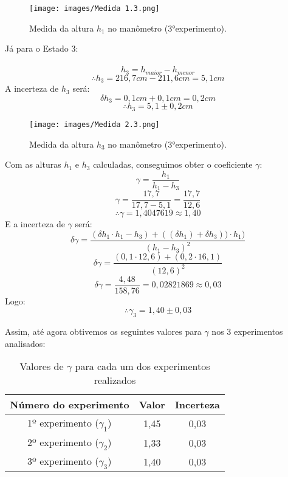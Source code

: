 \begin{figure}[H]
  \centering
  \texttt{[image: images/Medida 1.3.png]}
  \caption{Medida da altura $h_1$ no manômetro (3°experimento).}
\end{figure}

Já para o Estado 3:\\

\ \[h_3 = h_{maior} - h_{menor} \]
\[\therefore h_3 = 216,7 cm - 211,6 cm  = 5,1 cm\]
A incerteza de $h_3$ será:\\
\[\delta h_3 = 0,1 cm + 0,1 cm =  0,2 cm\]
\[\therefore h_3 = 5,1 \pm 0,2 cm\]


\begin{figure}[H]
  \centering
  \texttt{[image: images/Medida 2.3.png]}
  \caption{Medida da altura $h_3$ no manômetro (3°experimento).}
\end{figure}

Com as alturas $h_1$ e $h_3$ calculadas, conseguimos obter o coeficiente $\gamma$:\\

\[ \gamma = \frac{h_1}{h_1 - h_3}\]
\[ \gamma = \frac{17,7}{17,7 - 5,1} = \frac{17,7}{12,6} \]
\[\therefore \gamma = 1,4047619 \approx 1,40 \]
E a incerteza de $\gamma$ será:\\
\[\delta \gamma = \frac{(\delta h_1 \cdot h_1 - h_3)+((\delta h_1) + \delta h_3)) \cdot h_1)}{(h_1 - h_3)^2}\]
\[\delta \gamma = \frac{(0,1 \cdot 12,6)+(0,2 \cdot 16,1)}{(12,6)^2}\]
\[\delta \gamma = \frac{4,48}{158,76} = 0,02821869 \approx 0,03\]
Logo:\\ 
\[\therefore \gamma_3 = 1,40 \pm 0,03 \]

Assim, até agora obtivemos os seguintes valores para $\gamma$ nos 3 experimentos analisados:\\

\begin{table}[H]
    \centering
    \begin{tabular}{ |c||c||c| }
        \hline
        \textbf{Número do experimento} & \textbf{Valor} & \textbf{Incerteza}\\
        \hline 
        1º experimento ($\gamma_1$)       & 1,45   & 0,03  \\
        2º experimento ($\gamma_2$)       & 1,33   & 0,03  \\
        3º experimento ($\gamma_3$)       & 1,40   & 0,03  \\
        \hline
        \end{tabular}
    \caption{Valores de $\gamma$ para cada um dos experimentos realizados} 
\end{table}


